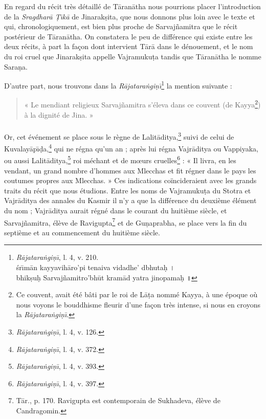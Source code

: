 \documentclass[a4paper, 11pt, oneside, french, landscape, twocolumn]{article}
\begin{document}
En regard du récit très détaillé de T\={a}ran\={a}tha nous pourrions placer l'introduction de la \emph{Sragdhar\={a} Ṭ\={\i}k\={a}} de Jinarak\d{s}ita, que nous donnons plus loin avec le texte et qui, chronologiquement, est bien plus proche de Sarvaj\~{n}amitra que le récit postérieur de T\={a}ran\={a}tha. On constatera le peu de différence qui existe entre les deux récits, à part la façon dont intervient T\={a}r\={a} dans le dénouement, et le nom du roi cruel que Jinarak\d{s}ita appelle Vajramuku\d{t}a tandis que T\={a}ran\={a}tha le nomme Sara\d{n}a.

D'autre part, nous trouvons dans la \emph{R\={a}jatara\.{n}gi\d{n}\={\i}}\footnote{\emph{R\={a}jatara\.{n}gi\d{n}\={\i}}, l. 4, v. 210.\\\hspace*{10mm}\'{s}r\={\i}m\={a}n kayyavih\={a}ro'pi tenaiva vidadhe' dbhuta\d{h} \texthindi{।}\\\hspace*{10mm}bhik\d{s}u\d{h} Sarvaj\~{n}amitro'bh\={u}t kram\={a}d yatra jinopama\d{h} \texthindi{॥}} la mention suivante :
\begin{quotation}\footnotesize
« Le mendiant religieux Sarvaj\~{n}amitra s'éleva dans ce couvent (de Kayya\footnote{Ce couvent, avait été bâti par le roi de L\={a}\d{t}a nommé Kayya, à une époque où nous voyons le bouddhisme fleurir d'une façon très intense, si nous en croyons la \emph{R\={a}jatara\.{n}gi\d{n}\={\i}}.}) à la dignité de Jina. »
\end{quotation}
\paragraph{}
Or, cet événement se place sous le règne de Lalit\={a}ditya,\footnote{\emph{R\={a}jatara\.{n}gi\d{n}\={\i}}, l. 4, v. 126.} suivi de celui de Kuvalay\={a}p\={\i}\d{d}a,\footnote{\emph{R\={a}jatara\.{n}gi\d{n}\={\i}}, l. 4, v. 372.} qui ne régna qu'un an ; après lui régna Vajr\={a}ditya ou Vappiyaka, ou aussi Lalit\={a}ditya,\footnote{\emph{R\={a}jatara\.{n}gi\d{n}\={\i}}, l. 4, v. 393.} roi méchant et de mœurs cruelles\footnote{\emph{R\={a}jatara\.{n}gi\d{n}\={\i}}, l. 4, v. 397.} : « Il livra, en les vendant, un grand nombre d'hommes aux Mlecchas et fit régner dans le pays les coutumes propres aux Mlecchas. » Ces indications coïncideraient avec les grands traits du récit que nous étudions. Entre les noms de Vajramuku\d{t}a du Stotra et Vajr\={a}ditya des annales du Kasmir il n'y a que la différence du deuxième élément du nom ; Vajr\={a}ditya aurait régné dans le courant du huitième siècle, et Sarvaj\~{n}amitra, élève de Ravigupta\footnote{T\={a}r., p. 170. Ravigupta est contemporain de Sukhadeva, élève de Candragomin.} et de Gu\d{n}aprabha, se place vers la fin du septième et au commencement du huitième siècle.
\end{document}
